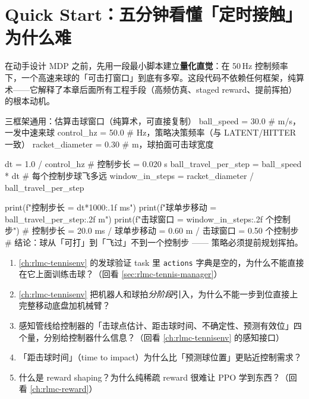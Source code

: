 \section*{Quick Start：五分钟看懂「定时接触」为什么难}
\label{sec:rlmc-strike-quickstart}

在动手设计 MDP 之前，先用一段最小脚本建立\textbf{量化直觉}：在 50\,Hz 控制频率下，一个高速来球的「可击打窗口」到底有多窄。这段代码不依赖任何框架，纯算术——它解释了本章后面所有工程手段（高频仿真、staged reward、提前挥拍）的根本动机。

\begin{codebox}[Python]{三框架通用：估算击球窗口（纯算术，可直接复制）}
ball_speed = 30.0       # m/s，一发中速来球
control_hz = 50.0       # Hz，策略决策频率（与 LATENT/HITTER 一致）
racket_diameter = 0.30  # m，球拍面可击球宽度

dt = 1.0 / control_hz                 # 控制步长 = 0.020 s
ball_travel_per_step = ball_speed * dt # 每个控制步球飞多远
window_in_steps = racket_diameter / ball_travel_per_step

print(f"控制步长       = {dt*1000:.1f} ms")
print(f"球单步移动     = {ball_travel_per_step:.2f} m")
print(f"击球窗口       = {window_in_steps:.2f} 个控制步")
# 控制步长 = 20.0 ms / 球单步移动 = 0.60 m / 击球窗口 = 0.50 个控制步
# 结论：球从「可打」到「飞过」不到一个控制步 —— 策略必须提前规划挥拍。
\end{codebox}

\begin{practice}
\begin{enumerate}
  \item \cref{ch:rlmc-tennisenv} 的发球验证 task 里 \verb|actions| 字典是空的，为什么不能直接在它上面训练击球？（回看 \cref{sec:rlmc-tennis-manager}）
  \item \cref{ch:rlmc-tennisenv} 把机器人和球拍\emph{分阶段}引入，为什么不能一步到位直接上完整移动底盘加机械臂？
  \item 感知管线给控制器的「击球点估计、距击球时间、不确定性、预测有效位」四个量，分别给控制器什么信息？（回看 \cref{ch:rlmc-tennisenv} 的感知接口）
  \item 「距击球时间」（time to impact）为什么比「预测球位置」更贴近控制需求？
  \item 什么是 reward shaping？为什么纯稀疏 reward 很难让 PPO 学到东西？（回看 \cref{ch:rlmc-reward}）
\end{enumerate}
\end{practice}


